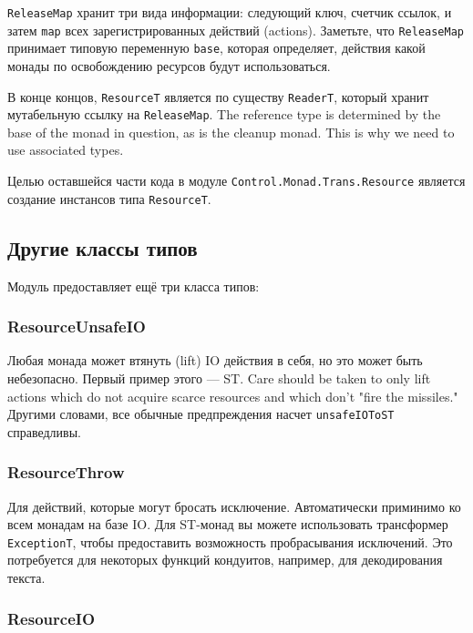 \lstinline'ReleaseMap' хранит три вида информации: следующий ключ, счетчик ссылок, и затем
\lstinline'map' всех
зарегистрированных действий (actions). Заметьте, что \lstinline'ReleaseMap' принимает
типовую переменную \lstinline'base', которая определяет, действия какой монады по
освобождению ресурсов  будут использоваться.

В конце концов, \lstinline'ResourceT' является по существу \lstinline'ReaderT', который
хранит мутабельную
ссылку на \lstinline'ReleaseMap'. The reference type is determined by the base
of the monad in question, as is the cleanup monad. This is why we need to use associated
types. 

Целью оставшейся части кода в модуле \lstinline'Control.Monad.Trans.Resource'
является создание инстансов типа \lstinline'ResourceT'.

\subsection{Другие классы типов}

Модуль предоставляет ещё три класса типов:
   
\subsubsection{ResourceUnsafeIO}
Любая монада может втянуть (lift) IO действия в себя, но это может быть небезопасно.
Первый пример этого --- ST. Care should be taken to
only lift actions which do not acquire scarce resources and which don't "fire the
missiles."  Другими словами, все обычные предпреждения насчет \lstinline'unsafeIOToST'
справедливы.
  
\subsubsection{ResourceThrow}

Для действий, которые могут бросать исключение. Автоматически приминимо ко всем
монадам на базе IO. Для ST-монад вы можете использовать трансформер
\lstinline'ExceptionT', чтобы
предоставить возможность пробрасывания исключений. Это потребуется для некоторых функций
кондуитов, например, для декодирования текста.
   
\subsubsection{ResourceIO}


